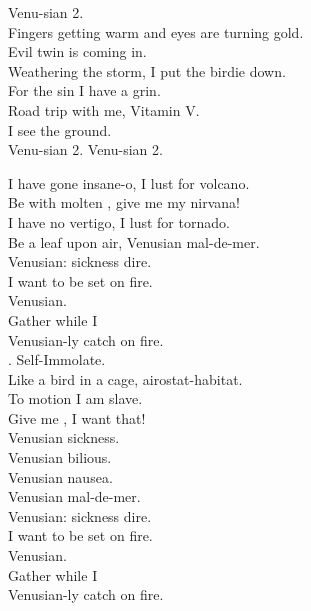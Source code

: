 Venu-sian 2. \\

Fingers getting warm and eyes are turning gold. \\
Evil twin is coming in. \\
Weathering the storm, I put the birdie down. \\
For the sin I have a grin. \\

Road trip with me, Vitamin V. \\
I see the ground. \\

Venu-sian 2. Venu-sian 2. \\





I have gone insane-o, I lust for volcano. \\
Be with molten , give me my nirvana! \\
I have no vertigo, I lust for tornado. \\
Be a leaf upon air, Venusian mal-de-mer. \\

Venusian: sickness dire. \\
I want to be set on fire. \\
Venusian. \\
Gather while I \\
Venusian-ly catch on fire. \\

. Self-Immolate. \\

Like a bird in a cage, airostat-habitat. \\
To motion I am slave. \\
Give me , I want that! \\
Venusian sickness. \\
Venusian bilious. \\
Venusian nausea. \\
Venusian mal-de-mer. \\

Venusian: sickness dire. \\
I want to be set on fire. \\
Venusian. \\
Gather while I \\
Venusian-ly catch on fire. \\

